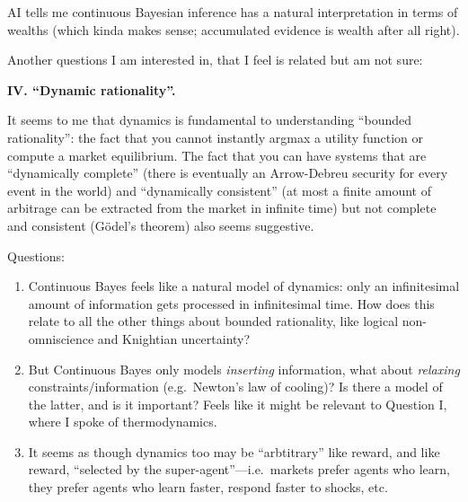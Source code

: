 AI tells me continuous Bayesian inference has a natural interpretation in terms of wealths (which kinda makes sense; accumulated evidence is wealth after all right).

Another questions I am interested in, that I feel is related but am not sure:

\textbf{IV. ``Dynamic rationality''.}

It seems to me that dynamics is fundamental to understanding ``bounded rationality'': the fact that you cannot instantly argmax a utility function or compute a market equilibrium. The fact that you can have systems that are ``dynamically complete'' (there is eventually an Arrow-Debreu security for every event in the world) and ``dynamically consistent'' (at most a finite amount of arbitrage can be extracted from the market in infinite time) but not complete and consistent (Gödel's theorem) also seems suggestive.

Questions:

\begin{enumerate}
\def\labelenumi{\arabic{enumi}.}
\tightlist
\item
  Continuous Bayes feels like a natural model of dynamics: only an infinitesimal amount of information gets processed in infinitesimal time. How does this relate to all the other things about bounded rationality, like logical non-omniscience and Knightian uncertainty?
\item
  But Continuous Bayes only models \emph{inserting} information, what about \emph{relaxing} constraints/information (e.g.~Newton's law of cooling)? Is there a model of the latter, and is it important? Feels like it might be relevant to Question I, where I spoke of thermodynamics.
\item
  It seems as though dynamics too may be ``arbtitrary'' like reward, and like reward, ``selected by the super-agent''---i.e.~markets prefer agents who learn, they prefer agents who learn faster, respond faster to shocks, etc.
\end{enumerate}
